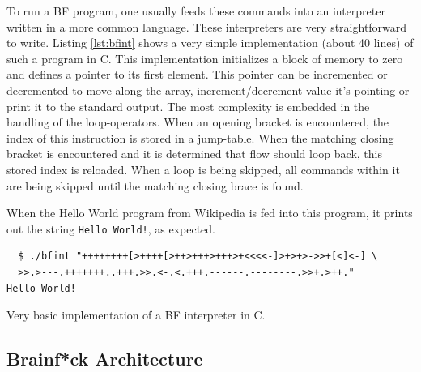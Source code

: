 To run a BF program, one usually feeds these commands into an interpreter written in a more common language. These interpreters are very straightforward to write. Listing \ref{lst:bfint} shows a very simple implementation (about 40 lines) of such a program in C. This implementation initializes a block of memory to zero and defines a pointer to its first element. This pointer can be incremented or decremented to move along the array, increment/decrement value it's pointing or print it to the standard output. The most complexity is embedded in the handling of the loop-operators. When an opening bracket is encountered, the index of this instruction is stored in a jump-table. When the matching closing bracket is encountered and it is determined that flow should loop back, this stored index is reloaded. When a loop is being skipped, all commands within it are being skipped until the matching closing brace is found.

When the Hello World program from Wikipedia \cite{bfwiki} is fed into this program, it prints out the string \texttt{Hello World!}, as expected.
\begin{lstlisting}
  $ ./bfint "++++++++[>++++[>++>+++>+++>+<<<<-]>+>+>->>+[<]<-] \
  >>.>---.+++++++..+++.>>.<-.<.+++.------.--------.>>+.>++."
Hello World!
\end{lstlisting}


\begin{lstfloat}[H]
    
\caption{Very basic implementation of a BF interpreter in C.}
\label{lst:bfint}
\end{lstfloat}



\subsection{Brainf*ck Architecture}
